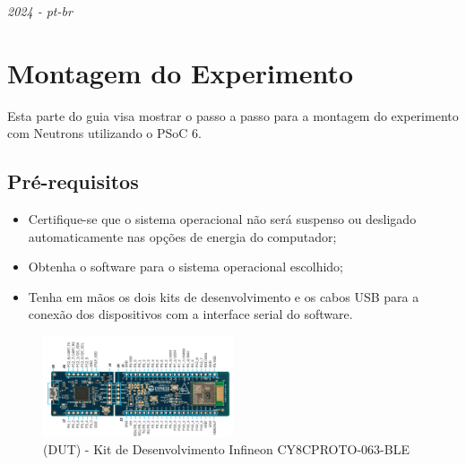 \documentclass[12pt, a4paper]{article}
\begin{document}
\thispagestyle{empty}

\vspace*{-1.5cm}

\noindent \textit{2024 - pt-br}

\vspace*{14pt}
{
\fontsize{32pt}{24pt}
}
\vspace*{12pt}

\tableofcontents

\section{Montagem do Experimento}

Esta parte do guia visa mostrar o passo a passo para a montagem do experimento com Neutrons utilizando o PSoC 6.

\subsection*{Pré-requisitos}

\begin{itemize}[leftmargin=1.3cm]
    \item Certifique-se que o sistema operacional não será suspenso ou desligado automaticamente nas opções de energia do computador;
    \item Obtenha o software  para o sistema operacional escolhido;
    \item Tenha em mãos os dois kits de desenvolvimento e os cabos USB para a conexão dos dispositivos com a interface serial do software.
\end{itemize}

\begin{figure}[H]
    \centering
    \caption{(DUT) - Kit de Desenvolvimento Infineon CY8CPROTO-063-BLE}
    \includegraphics[width=0.5\textwidth]{../imgs/psoc63_DUT.png}

    \vspace{0.5em}
    \label{fig:psoc6}
\end{figure}
\end{document}
